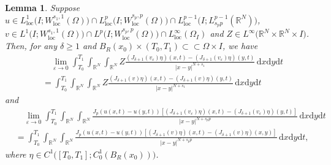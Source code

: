 \documentclass[reqno,10pt]{amsart}
\numberwithin{equation}{section}
\newtheorem{lemma}[theorem]{Lemma}
\begin{document}
\begin{lemma}
	\label{lem2}
	Suppose $u\in L^1_\mathrm{loc}\bigl(I;W^{s_1,1}_\mathrm{loc}(\Omega)\bigl)\cap L^p_\mathrm{loc}\bigl( I;W^{s_p,p}_\mathrm{loc}(\Omega)\bigl)\cap L^{p-1}_\mathrm{loc}\bigl( I;L^{p-1}_{s_pp}(\mathbb{R}^N)\bigl)$, $v\in L^1\bigl( I;W^{s_1,1}_\mathrm{loc}(\Omega)\bigl)\cap L^p\bigl( I;W^{s_p,p}_\mathrm{loc}(\Omega)\bigl)\cap L^\infty_\mathrm{loc}(\Omega_I)$ and $Z\in L^\infty\bigl( \mathbb{R}^N\times\mathbb{R}^N\times I\bigl) $. Then, for any $\delta\ge1$ and $B_R(x_0)\times(T_0,T_1)\subset\subset\Omega\times I$, we have
	\begin{align}
		\label{1.3}
		&\quad\lim\limits_{\varepsilon\rightarrow0}\int_{T_0}^{T_1}\int_{\mathbb{R}^N}\int_{\mathbb{R}^N}Z\frac{\left( J_{\delta+1}(v_\varepsilon)\eta\right) (x,t)-\left( J_{\delta+1}(v_\varepsilon)\eta\right) (y,t)}{|x-y|^{N+s_1}}\,\mathrm{d}x\mathrm{d}y\mathrm{d}t\nonumber\\
		&=\int_{T_0}^{T_1}\int_{\mathbb{R}^N}\int_{\mathbb{R}^N}Z\frac{\left( J_{\delta+1}(v)\eta\right) (x,t)-\left( J_{\delta+1}(v)\eta\right) (y,t)}{|x-y|^{N+s_1}}\,\mathrm{d}x\mathrm{d}y\mathrm{d}t
	\end{align}
	and
	\begin{align}
		\label{1.4}
		&\quad\lim\limits_{\varepsilon\rightarrow0}\int_{T_0}^{T_1}\int_{\mathbb{R}^N}\int_{\mathbb{R}^N}\frac{J_p\left( u(x,t)-u(y,t)\right)\left[ \left( J_{\delta+1}(v_\varepsilon)\eta\right)(x,t)-\left( J_{\delta+1}(v_\varepsilon)\eta\right)(y,t)\right]}{|x-y|^{N+s_pp}}\,\mathrm{d}x\mathrm{d}y\mathrm{d}t\nonumber\\
		&=\int_{T_0}^{T_1}\int_{\mathbb{R}^N}\int_{\mathbb{R}^N}\frac{J_p\left( u(x,t)-u(y,t)\right)\left[ \left( J_{\delta+1}(v)\eta\right)(x,t)-\left( J_{\delta+1}(v)\eta\right)(x,y)\right] }{|x-y|^{N+s_pp}}\,\mathrm{d}x\mathrm{d}y\mathrm{d}t,
	\end{align}
	where $\eta\in C^1\bigl([T_0,T_1];C^1_0(B_R(x_0))\bigl)$.
\end{lemma}
\end{document}
